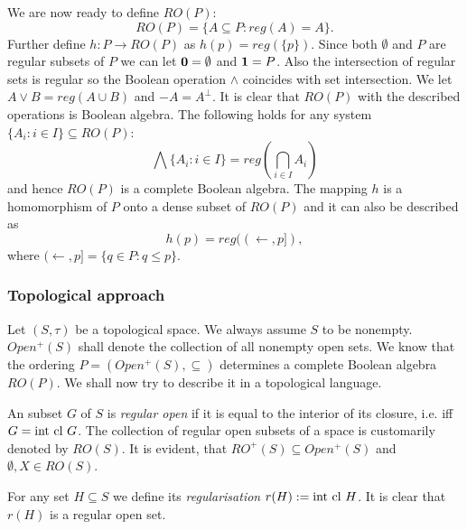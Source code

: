 \medskip

We are now ready to define $RO(P)$\label{RO}:
$$ %
 RO(P)=\{A\subseteq P:reg(A)=A\}.
$$ %
Further define $h:P\to RO(P)$ as $h(p)=reg(\{p\})$. Since both $\emptyset$ and $P$ are
regular subsets of $P$ we can let $\hbox{\bf 0}=\emptyset$ and $\hbox{\bf 1}=P$. Also the intersection of regular
sets is regular so the Boolean operation $\wedge$ coincides with set intersection. We
let $A\vee B=reg(A\cup B)$ and $-A=A^{\perp}$. It is clear that $RO(P)$ with the described
operations is Boolean algebra. The following holds for any system $\{A_i:i\in I\}\subseteq RO(P)$:
$$ %
 \bigwedge \{A_i:i\in I\}=reg(\bigcap_{i\in I} A_i)
$$ %
and hence $RO(P)$ is a complete Boolean algebra. The mapping $h$ is a homomorphism of $P$ onto
a dense subset of $RO(P)$ and it can also be described as
$$ %
 h(p)=reg((\leftarrow,p]),
$$ %
where $(\leftarrow,p]=\{q\in P:q\leq p\}$.

\subsubsection{Topological approach}

Let $(S,\tau)$ be a topological space. We always assume $S$ to be nonempty.
$Open^{+}(S)$ shall denote the collection of all nonempty open sets. We know that
the ordering $P=(Open^{+}(S),\subseteq)$ determines a complete Boolean algebra $RO(P)$. We shall now
try to describe it in a topological language.

\begin{definition}
An subset $G$ of $S$ is \emph{regular open} if it is equal to
 the interior of its closure, i.e. iff $G=\hbox{int}\ \hbox{cl}\ G$. The collection of regular
 open subsets of a space is customarily denoted by $RO(S)$. It is evident, that
 $RO^{+}(S)\subseteq Open^{+}(S)$ and $\emptyset, X\in RO(S)$.

 For any set $H\subseteq S$ we define its \emph{regularisation} $r(H):=\hbox{int}\ \hbox{cl}\ H$. It is clear that $r(H)$
 is a regular open set.
\end{definition}

%

